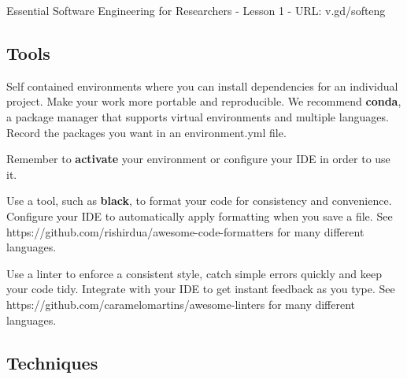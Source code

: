 \documentclass[8pt]{extarticle}
\begin{document}
\thispagestyle{empty}

\begin{center}
  {\LARGE
  Essential Software Engineering for Researchers - Lesson 1 - URL: v.gd/softeng}
\end{center}

\subsection*{Tools}

\begin{navybox}[title=Virtual Environments]
  Self contained environments where you can install dependencies for an
  individual project. Make your work more portable and reproducible. We
  recommend \textbf{conda}, a package manager that supports virtual environments
  and multiple languages. Record the packages you want in an environment.yml
  file.\par
  \vspace{5pt minus 3pt}

  \quad
  \vspace{5pt minus 3pt}

  Remember to \textbf{activate} your environment or configure your IDE in order
  to use it.
\end{navybox}

\begin{bluebox}[title=Code Formatters]
  Use a tool, such as \textbf{black}, to format your code for consistency and
  convenience. Configure your IDE to automatically apply formatting when you
  save a file. See https://github.com/rishirdua/awesome-code-formatters for
  many different languages.
\end{bluebox}

\begin{navybox}[title=Linters]
  Use a linter to enforce a consistent style, catch simple errors quickly and
  keep your code tidy. Integrate with your IDE to get instant feedback as you
  type. See https://github.com/caramelomartins/awesome-linters for many
  different languages.
\end{navybox}

\subsection*{Techniques}
\end{document}
